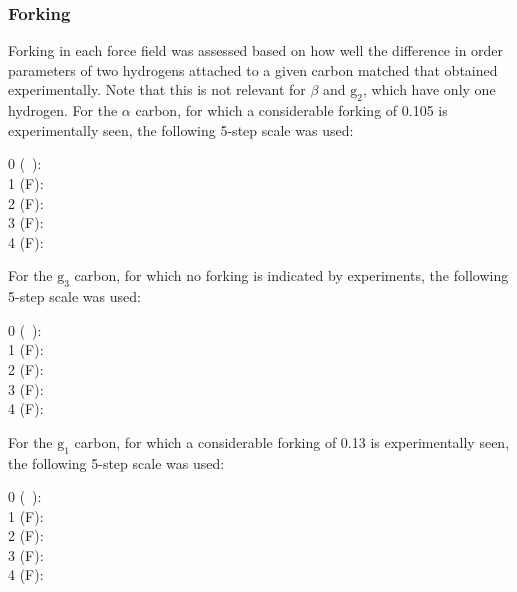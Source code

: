 \documentclass[journal=jpcbfk]{achemso}
\begin{document}
\subsubsection*{Forking}
Forking in each force field was assessed based on how well the difference in order parameters of two hydrogens attached to a given carbon matched that obtained experimentally. Note that this is not relevant for $\beta$ and $\mathrm{g_2}$, which have only one hydrogen. For the $\alpha$ carbon,  for which a considerable forking of 0.105 is experimentally seen, the following 5-step scale was used:
\begin{description}
\item [0 (~):] 
%
\item [1 ({\textsf{\tiny F}}):] 
%
\item [2  ({\textsf{\small F}}):] 
%
\item [3 ({\textsf{\large F}}):] 
%
\item [4 ({\textsf{\Large F}}):] 
\end{description}
%
For the $\mathrm{g_3}$ carbon, for which no forking is indicated by experiments, the following 5-step scale was used:
%
\begin{description}
\item [0 (~):] 
%
\item [1 ({\textsf{\tiny F}}):] 
%
\item [2  ({\textsf{\small F}}):] 
%
\item [3 ({\textsf{\large F}}):] 
%
\item [4 ({\textsf{\Large F}}):] 
\end{description}
%
For the $\mathrm{g_1}$ carbon, for which a considerable forking of 0.13 is experimentally seen, the following 5-step scale was used:
%
\begin{description}
\item [0 (~):] 
%
\item [1 ({\textsf{\tiny F}}):] 
%
\item [2  ({\textsf{\small F}}):] 
%
\item [3 ({\textsf{\large F}}):] 
%
\item [4 ({\textsf{\Large F}}):] 
\end{description}
\end{document}
